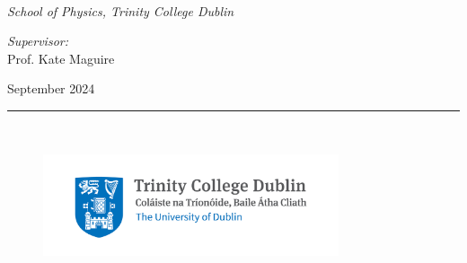 \documentclass[a4paper,oneside,12pt]{Latex/Classes/PhDthesisPSnPDF}
\begin{document}
\vspace*{\fill}
\begin{flushright}
{ \\[1mm]
{\textnormal{\textit{School of Physics, Trinity College Dublin}}\\}

\vspace*{\fill}
\begin{flushright}
\textnormal{
\textit{Supervisor:} \\
Prof. Kate Maguire}\\[0.5mm]
\end{flushright}
{September 2024}\\[5mm]
\rule{0.9\textwidth}{0.5mm}\\[4mm]
%
\begin{figure}[ht!]
\hspace{1mm}
\raggedleft
\includegraphics[height=30mm]{Other/tcd_logo.png}
\end{figure}

%
}
\end{flushright}


\frontmatter









\setcounter{secnumdepth}{3} %
\setcounter{tocdepth}{3}    %
\tableofcontents            %



\listoffigures	%
\listoftables  %
\end{document}
